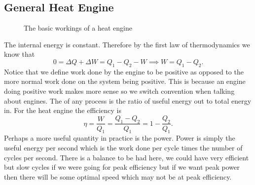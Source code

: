     \subsection{General Heat Engine}
    \begin{figure}
        \centering
        \caption{The basic workings of a heat engine}
        \label{fig:heat engine}
    \end{figure}
    The internal energy is constant.
    Therefore by the first law of thermodynamics we know that
    \[0 = \Delta Q + \Delta W = Q_1 - Q_2 - W \implies W = Q_1 - Q_2.\]
    Notice that we define work done by the engine to be positive as opposed to the more normal work done on the system being positive.
    This is because an engine doing positive work makes more sense so we switch convention when talking about engines.
    The  of any process is the ratio of useful energy out to total energy in.
    For the heat engine the efficiency is
    \[\eta = \frac{W}{Q_1} = \frac{Q_1 - Q_2}{Q_1} = 1 - \frac{Q_2}{Q_1}.\]
    Perhaps a more useful quantity in practice is the power.
    Power is simply the useful energy per second which is the work done per cycle times the number of cycles per second.
    There is a balance to be had here, we could have very efficient but slow cycles if we were going for peak efficiency but if we want peak power then there will be some optimal speed which may not be at peak efficiency.
    
